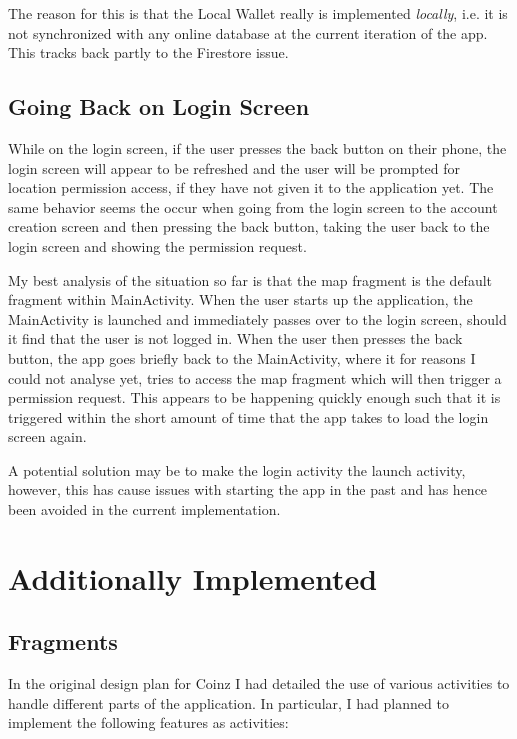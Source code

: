 \documentclass[11pt,a4paper,notitlepage]{article}
\begin{document}
    The reason for this is that the Local Wallet really is implemented \emph{locally}, i.e. it is not synchronized with any online database at the current iteration of the app.  This tracks back partly to the Firestore issue. \cite{firestore-issue}

\subsection{Going Back on Login Screen}

    While on the login screen, if the user presses the back button on their phone, the login screen will appear to be refreshed and the user will be prompted for location permission access, if they have not given it to the application yet. The same behavior seems the occur when going from the login screen to the account creation screen and then pressing the back button, taking the user back to the login screen and showing the permission request.

    My best analysis of the situation so far is that the map fragment is the default fragment within MainActivity. When the user starts up the application, the MainActivity is launched and immediately passes over to the login screen, should it find that the user is not logged in. When the user then presses the back button, the app goes briefly back to the MainActivity, where it for reasons I could not analyse yet, tries to access the map fragment which will then trigger a permission request. This appears to be happening quickly enough such that it is triggered within the short amount of time that the app takes to load the login screen again.

    A potential solution may be to make the login activity the launch activity, however, this has cause issues with starting the app in the past and has hence been avoided in the current implementation.

\section{Additionally Implemented}

\subsection{Fragments}

    In the original design plan for Coinz I had detailed the use of various activities to handle different parts of the application. In particular, I had planned to implement the following features as activities:
\end{document}
